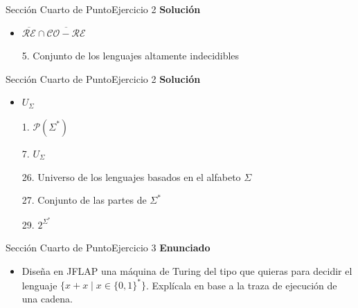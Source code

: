 \documentclass[10pt, envcountsect, presentation, aspectratio=169]{beamer}
\begin{document}

\begin{frame}{Sección Cuarto de Punto}{Ejercicio 2}
    \textbf{Solución}\\
    \begin{itemize}
        \item $\overline{\mathcal{RE}} \cap \overline{\mathcal{CO-RE}}$
        \item[5.] Conjunto de los lenguajes altamente indecidibles
    \end{itemize}
\end{frame}


\begin{frame}{Sección Cuarto de Punto}{Ejercicio 2}
    \textbf{Solución}\\
    \begin{itemize}
        \item $U_\Sigma$
        \item[1.] $\mathcal{P}(\Sigma^*)$
        \item[7.] $U_\Sigma$
        \item[26.] Universo de los lenguajes basados en el alfabeto $\Sigma$
        \item[27.] Conjunto de las partes de $\Sigma^*$
        \item[29.] $2^{\Sigma^*}$
    \end{itemize}
\end{frame}


\begin{frame}{Sección Cuarto de Punto}{Ejercicio 3}
\textbf{Enunciado}
	\begin{itemize}
        \item Diseña en JFLAP una máquina de Turing del tipo que quieras para decidir el lenguaje $\{x+x \mid x\in\{0,1\}^*\}$. Explícala en base a la traza de ejecución de una cadena.
	\end{itemize}
\end{frame}

\end{document}
